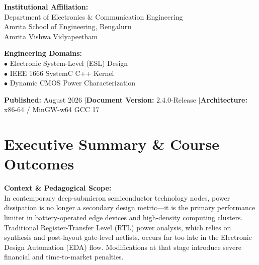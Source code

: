 \documentclass[11pt,a4paper,oneside]{report}
\begin{document}
\begin{titlepage}
\vspace{1.5cm}

\begin{flushleft}
\hspace{1.2cm}
\begin{minipage}{0.45\textwidth}
    \textbf{\color{NavyDark} Institutional Affiliation:}\\[0.1cm]
    {\small Department of Electronics \& Communication Engineering\\
    Amrita School of Engineering, Bengaluru\\
    Amrita Vishwa Vidyapeetham}
\end{minipage}
\hfill
\begin{minipage}{0.45\textwidth}
    \textbf{\color{NavyDark} Engineering Domains:}\\[0.1cm]
    {\small $\bullet$ Electronic System-Level (ESL) Design\\
    $\bullet$ IEEE 1666 SystemC C++ Kernel\\
    $\bullet$ Dynamic CMOS Power Characterization}
\end{minipage}
\end{flushleft}

\vfill

\begin{center}
    \small\color{white}
    \textbf{Published:} August 2026 \quad$\vert$\quad \textbf{Document Version:} 2.4.0-Release \quad$\vert$\quad \textbf{Architecture:} x86-64 / MinGW-w64 GCC 17
\end{center}

\end{titlepage}

\chapter*{Executive Summary \& Course Outcomes}

\noindent\textbf{Context \& Pedagogical Scope:}\\
In contemporary deep-submicron semiconductor technology nodes, power dissipation is no longer a secondary design metric---it is the primary performance limiter in battery-operated edge devices and high-density computing clusters. Traditional Register-Transfer Level (RTL) power analysis, which relies on synthesis and post-layout gate-level netlists, occurs far too late in the Electronic Design Automation (EDA) flow. Modifications at that stage introduce severe financial and time-to-market penalties.
\end{document}
